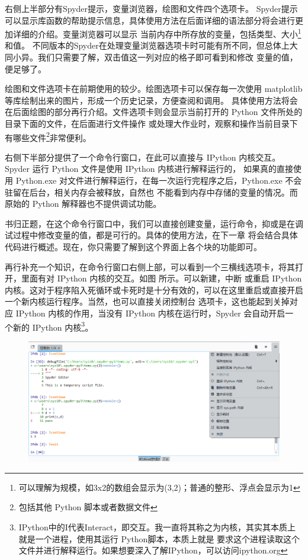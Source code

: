 右侧上半部分有Spyder提示，变量浏览器，绘图和文件四个选项卡。
Spyder提示可以显示库函数的帮助提示信息，具体使用方法在后面详细的语法部分将会进行更加详细的介绍。变量浏览器可以显示
当前内存中所存放的变量，包括类型、大小\footnote{可以理解为规模，如3x2的数组会显示为(3,2)；普通的整形、浮点会显示为1}和值。
不同版本的Spyder在处理变量浏览器选项卡时可能有所不同，但总体上大同小异。我们只需要了解，双击值这一列对应的格子即可看到和修改
变量的值，便足够了。

绘图和文件选项卡在前期使用的较少。绘图选项卡可以保存每一次使用 matplotlib 等库绘制出来的图片，形成一个历史记录，方便查阅和调用。
具体使用方法将会在后面绘图的部分再行介绍。文件选项卡则会显示当前打开的 Python 文件所处的目录下面的文件，在后面进行文件操作
或处理大作业时，观察和操作当前目录下有哪些文件\footnote{包括其他 Python 脚本或者数据文件}非常便利。

右侧下半部分提供了一个命令行窗口，在此可以直接与 IPython 内核交互。Spyder 运行 Python 文件是使用 IPython 内核进行解释运行的，
如果真的直接使用 Python.exe 对文件进行解释运行，在每一次运行完程序之后，Python.exe 不会驻留在后台，相关内存会被释放，自然也
不能看到内存中存储的变量的情况。而原始的 Python 解释器也不提供调试功能。

书归正题，在这个命令行窗口中，我们可以直接创建变量，运行命令，抑或是在调试过程中修改变量的值，都是可行的。具体的使用方法，在下一章
将会结合具体代码进行概述。现在，你只需要了解到这个界面上各个块的功能即可。

再行补充一个知识，在命令行窗口右侧上部，可以看到一个三横线选项卡，将其打开，里面有对 IPython 内核的交互。如图 所示。可以新建，中断
或重启 IPython 内核。这对于程序陷入死循环或卡死时是十分有效的，可以在这里重启或直接开启一个新内核运行程序。当然，也可以直接关闭控制台
选项卡，这也能起到关掉对应 IPython 内核的作用，当没有 IPython 内核在运行时，Spyder 会自动开启一
个新的 IPython 内核\footnote{IPython中的I代表Interact，即交互。我一直将其称之为内核，其实其本质上就是一个进程，使用其运行 Python脚本，本质上就是
要求这个进程读取这个文件并进行解释运行。如果想要深入了解IPython，可以访问ipython.org}。
\begin{figure}[htbp]
    \centering
    \includegraphics[width=0.8\linewidth]{pic/ipython_interact.png}
\end{figure}

